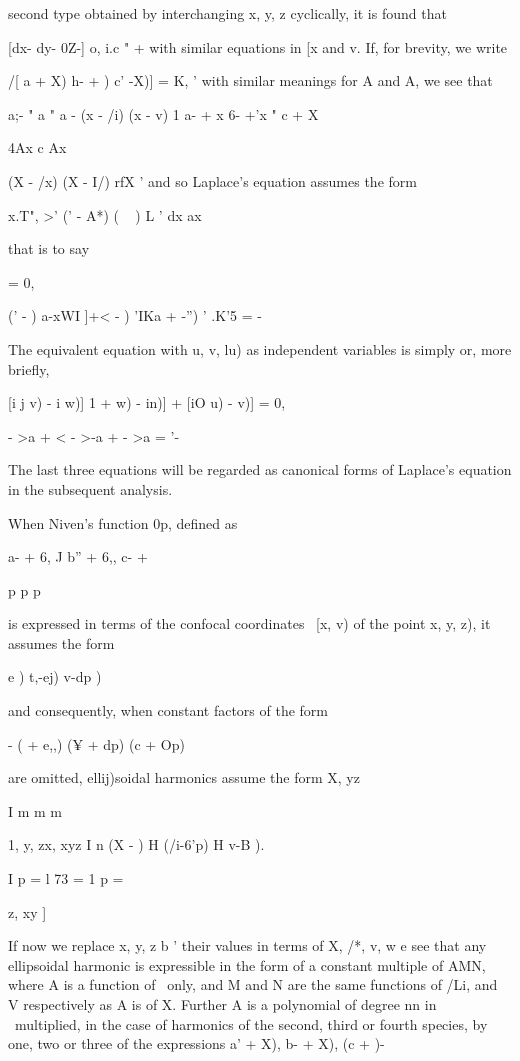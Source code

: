 {{{second type obtained by interchanging x, y, z cyclically, it is found
that

[dx- dy- 0Z-] o, i.c " + with similar equations in [x and v. If, for
brevity, we write

 /[ a + X) h- + ) c' -X)] = K, ' with similar meanings for A and A,
we see that

a;- " a " a - (x - /i) (x - v) 1 a- + x 6- +'x " c + X

4Ax c Ax

(X - /x) (X - I/) rfX ' and so Laplace's equation assumes the form

x.T", >' (' - A*) ( ~ ) L ' dx ax

that is to say

= 0,

(' - ) a-xWI ]+< - ) 'IKa + -'') ' .K'5 = -

The equivalent equation with u, v, lu) as independent variables is
simply or, more briefly,

[i j v) - i w)] 1 + w) - in)] + [iO u) - v)] = 0,

 - >a + < - >-a + - >a = '-

The last three equations will be regarded as canonical forms of
Laplace's equation in the subsequent analysis.

When Niven's function 0p, defined as

a- + 6, J b'' + 6,, c- +

p p p

%
%

is expressed in terms of the confocal coordinates \ [x, v) of the
point x, y, z), it assumes the form

  e ) t,-ej) v-dp )

and consequently, when constant factors of the form

- ( + e,,) (¥ + dp) (c + Op)

are omitted, ellij)soidal harmonics assume the form X, yz \

I m m m

1, y, zx, xyz I n (X - ) H (/i-6'p) H v-B ).

I p = l 73 = 1 p = \

z, xy ]

If now we replace x, y, z b ' their values in terms of X, /*, v, w e
see that any ellipsoidal harmonic is expressible in the form of a
constant multiple of AMN, where A is a function of \ only, and M and N
are the same functions of /Li, and V respectively as A is of X.
Further A is a polynomial of degree nn in \ multiplied, in the case of
harmonics of the second, third or fourth species, by one, two or three
of the expressions \/ a' + X), \/ b- + X), \/(c + )-

}}}

